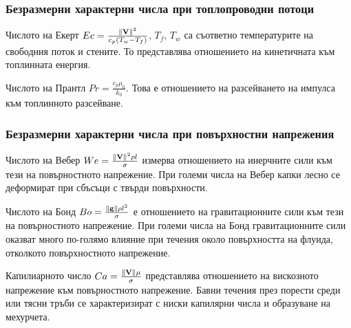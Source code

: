 \documentclass[bulgarian, 12pt]{article}
\begin{document}
\subsubsection{Безразмерни характерни числа при топлопроводни потоци}
Числото на Екерт $Ec = \frac{\norm{\mathbf{V}}^2}{c_p(T_w - T_f)}$, $T_f,\, T_w$ са съответно температурите на свободния поток и стените.
То представлява отношението на кинетичната към топлинната енергия.

Числото на Прантл $Pr = \frac{c_p \mu_0}{k_0}$.
Това е отношението на разсейването на импулса към топлинното разсейване.

\subsubsection{Безразмерни характерни числа при повърхностни напрежения}
Числото на Вебер $We = \frac{\norm{\mathbf{V}}^2 \rho l}{\sigma}$ измерва отношението на инерчните сили към тези на повърностното напрежение.
При големи числа на Вебер капки лесно се деформират при сбъсъци с твърди повърхности.

Числото на Бонд $Bo = \frac{\norm{\mathbf{g}} \rho l^2 }{\sigma}$ е отношението на гравитационните сили към тези на повърностното напрежение.
При големи числа на Бонд гравитационните сили оказват много по-голямо влияние при течения около повърхността на флуида, отколкото повърхностното напрежение.

Капилиарното число $Ca = \frac{\norm{\mathbf{V}} \mu}{\sigma}$ представлява отношението на вискозното напрежение към повърностното напрежение.
Бавни течения през порести среди или тясни тръби се характеризират с ниски капилярни числа и образуване на мехурчета.
\end{document}
